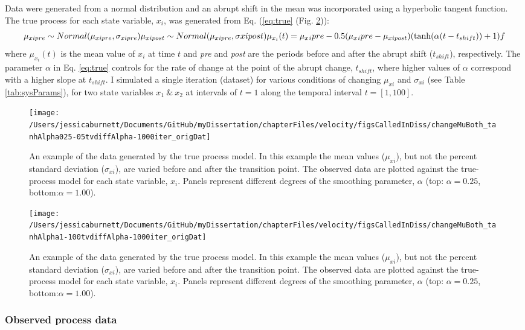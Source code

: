 \documentclass[12pt,twoside,openany]{reedthesis}
\begin{document}
Data were generated from a normal distribution and an abrupt shift in the mean was incorporated using a hyperbolic tangent function. The true process for each state variable, \(x_i\), was generated from Eq. (\eqref{eq:true} (Fig. \ref{fig:trueObsEx})):
\begin{equation}
\mu_{xipre}\sim Normal(\mu_{xipre},\sigma_{xipre}) \\ 
\mu_{xipost} \sim Normal(\mu_{xipre}, \sigma{xipost}) \\ 
\mu_{x_i}(t) = \mu_x{_ipre}  - 0.5(\mu_x{_ipre}-\mu_{xipost})(\tanh(\alpha (t-t_{shift}))+1) \\ f
\label{eq:true}
\end{equation}
where \(\mu_{x_i}(t)\) is the mean value of \(x_i\) at time \(t\) and \emph{pre} and \emph{post} are the periods before and after the abrupt shift (\(t_{shift}\)), respectively. The parameter \(\alpha\) in Eq. \eqref{eq:true} controls for the rate of change at the point of the abrupt change, \(t_{shift}\), where higher values of \(\alpha\) correspond with a higher slope at \(t_{shift}\). I simulated a single iteration (dataset) for various conditions of changing \(\mu_{xi}\) and \(\sigma_{xi}\) (see Table \ref{tab:sysParams}), for two state variables \(x_1\ \&\ x_2\) at intervals of \(t=1\) along the temporal interval \(t=[1,100]\).
\begin{figure}
\texttt{[image: /Users/jessicaburnett/Documents/GitHub/myDissertation/chapterFiles/velocity/figsCalledInDiss/changeMuBoth\_tanhAlpha025-05tvdiffAlpha-1000iter\_origDat]} \caption{An example of the data generated by the true process model. In this example the mean values ($\mu_{xi}$), but not the percent standard deviation ($\sigma_{xi}$), are varied before and after the transition point. The observed data are plotted against the true-process model for each state variable, $x_i$. Panels represent different degrees of the smoothing parameter, $\alpha$ (top: $\alpha=0.25$, bottom:$\alpha=1.00$).}\label{fig:trueObsEx}
\end{figure}
\begin{figure}
\texttt{[image: /Users/jessicaburnett/Documents/GitHub/myDissertation/chapterFiles/velocity/figsCalledInDiss/changeMuBoth\_tanhAlpha1-100tvdiffAlpha-1000iter\_origDat]} \caption{An example of the data generated by the true process model. In this example the mean values ($\mu_{xi}$), but not the percent standard deviation ($\sigma_{xi}$), are varied before and after the transition point. The observed data are plotted against the true-process model for each state variable, $x_i$. Panels represent different degrees of the smoothing parameter, $\alpha$ (top: $\alpha=0.25$, bottom:$\alpha=1.00$).}\label{fig:trueObsEx}
\end{figure}
\hypertarget{observed-process-data}{%
\subsubsection{Observed process data}\label{observed-process-data}}
\end{document}
